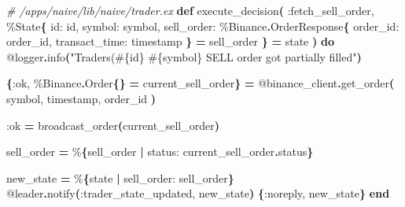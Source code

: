 \documentclass[
  oneside]{book}
\newenvironment{Shaded}{\begin{snugshade}}{\end{snugshade}}
\newcommand{\CommentTok}[1]{\textcolor[rgb]{0.56,0.35,0.01}{\textit{#1}}}
\newcommand{\ConstantTok}[1]{\textcolor[rgb]{0.56,0.35,0.01}{#1}}
\newcommand{\FunctionTok}[1]{\textcolor[rgb]{0.13,0.29,0.53}{\textbf{#1}}}
\newcommand{\KeywordTok}[1]{\textcolor[rgb]{0.13,0.29,0.53}{\textbf{#1}}}
\newcommand{\NormalTok}[1]{#1}
\newcommand{\OperatorTok}[1]{\textcolor[rgb]{0.81,0.36,0.00}{\textbf{#1}}}
\newcommand{\OtherTok}[1]{\textcolor[rgb]{0.56,0.35,0.01}{#1}}
\newcommand{\StringTok}[1]{\textcolor[rgb]{0.31,0.60,0.02}{#1}}
\newcommand{\VariableTok}[1]{\textcolor[rgb]{0.00,0.00,0.00}{#1}}
\begin{document}
\begin{Shaded}
\begin{Highlighting}[]
\CommentTok{\# /apps/naive/lib/naive/trader.ex}
  \KeywordTok{def}\NormalTok{ execute\_decision}\FunctionTok{(}
         \VariableTok{:fetch\_sell\_order}\NormalTok{,}
\NormalTok{         \%}\ConstantTok{State}\FunctionTok{\{}
           \VariableTok{id:}\NormalTok{ id,}
           \VariableTok{symbol:}\NormalTok{ symbol,}
           \VariableTok{sell\_order:}
\NormalTok{             \%}\ConstantTok{Binance}\OperatorTok{.}\ConstantTok{OrderResponse}\FunctionTok{\{}
               \VariableTok{order\_id:}\NormalTok{ order\_id,}
               \VariableTok{transact\_time:}\NormalTok{ timestamp}
             \FunctionTok{\}} \OperatorTok{=}\NormalTok{ sell\_order}
         \FunctionTok{\}} \OperatorTok{=}\NormalTok{ state}
       \FunctionTok{)} \KeywordTok{do}
    \OtherTok{@logger}\OperatorTok{.}\NormalTok{info}\FunctionTok{(}\StringTok{"Trader\textquotesingle{}s(}\OtherTok{\#\{}\NormalTok{id}\OtherTok{\}}\StringTok{ }\OtherTok{\#\{}\NormalTok{symbol}\OtherTok{\}}\StringTok{ SELL order got partially filled"}\FunctionTok{)}

    \FunctionTok{\{}\VariableTok{:ok}\NormalTok{, \%}\ConstantTok{Binance}\OperatorTok{.}\ConstantTok{Order}\FunctionTok{\{\}} \OperatorTok{=}\NormalTok{ current\_sell\_order}\FunctionTok{\}} \OperatorTok{=}
      \OtherTok{@binance\_client}\OperatorTok{.}\NormalTok{get\_order}\FunctionTok{(}
\NormalTok{        symbol,}
\NormalTok{        timestamp,}
\NormalTok{        order\_id}
      \FunctionTok{)}

    \VariableTok{:ok} \OperatorTok{=}\NormalTok{ broadcast\_order}\FunctionTok{(}\NormalTok{current\_sell\_order}\FunctionTok{)}

\NormalTok{    sell\_order }\OperatorTok{=}\NormalTok{ \%}\FunctionTok{\{}\NormalTok{sell\_order }\OperatorTok{|} \VariableTok{status:}\NormalTok{ current\_sell\_order}\OperatorTok{.}\NormalTok{status}\FunctionTok{\}}

\NormalTok{    new\_state }\OperatorTok{=}\NormalTok{ \%}\FunctionTok{\{}\NormalTok{state }\OperatorTok{|} \VariableTok{sell\_order:}\NormalTok{ sell\_order}\FunctionTok{\}}
    \OtherTok{@leader}\OperatorTok{.}\NormalTok{notify}\FunctionTok{(}\VariableTok{:trader\_state\_updated}\NormalTok{, new\_state}\FunctionTok{)}
    \FunctionTok{\{}\VariableTok{:noreply}\NormalTok{, new\_state}\FunctionTok{\}}
  \KeywordTok{end}
\end{Highlighting}
\end{Shaded}
\end{document}
